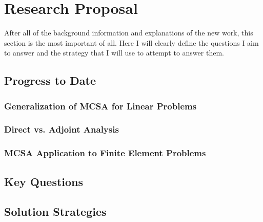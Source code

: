 \chapter{Research Proposal}
\label{ch:research_proposal}

After all of the background information and explanations of the new
work, this section is the most important of all. Here I will clearly
define the questions I aim to answer and the strategy that I will use
to attempt to answer them.

\section{Progress to Date}
\label{sec:progress}

\subsection{Generalization of MCSA for Linear Problems}
\label{subsec:mcsa_generalization}

\subsection{Direct vs. Adjoint Analysis}
\label{subsec:mcsa_direct_vs_adjoint}

\subsection{MCSA Application to Finite Element Problems}
\label{subsec:mcsa_finite_element}

\section{Key Questions}
\label{sec:key_questions}

\section{Solution Strategies}
\label{seq:solution_strategies}
